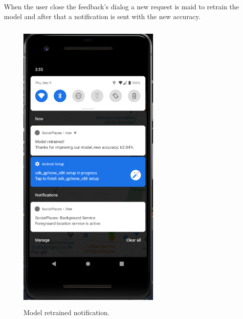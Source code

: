 \documentclass[../../main]{subfiles}
\begin{document}
When the user close the feedback's dialog a new request is maid to retrain the model and after that a notification is sent with the new accuracy.
\begin{figure}[H]
    \centering
    \includegraphics[width=70mm,height=150mm]{images/app/notification/recommendation/new_accuracy.png}
    \caption{Model retrained notification.}
\end{figure}
\end{document}

